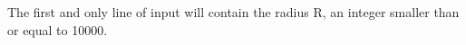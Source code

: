 The first and only line of input will contain the radius R, an integer smaller than or equal to 10000.